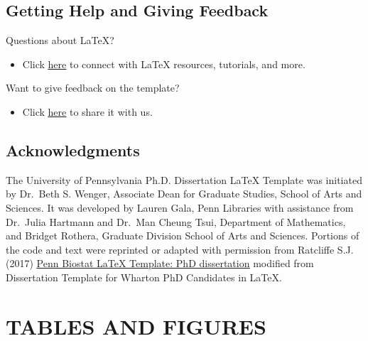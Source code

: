 \documentclass[11pt]{report}
\begin{document}
\begin{mainf}
\section{Getting Help and Giving Feedback} \label{sec:helpfeedback}
Questions about LaTeX?
\begin{itemize}
    \item Click \underline{\href{https://guides.library.upenn.edu/LaTeX}{here}} to connect with LaTeX resources, tutorials, and more.
\end{itemize}
Want to give feedback on the template?
\begin{itemize}
    \item Click \underline{\href{https://upenn.libwizard.com/f/dissertationlatextemplatefeedback}{here}} to share it with us.
\end{itemize}

\section{Acknowledgments}
The University of Pennsylvania Ph.D. Dissertation LaTeX Template was initiated by Dr.~Beth S. Wenger, Associate Dean for Graduate Studies, School of Arts and Sciences. It was developed by Lauren Gala, Penn Libraries with assistance from Dr.~Julia Hartmann and Dr.~Man Cheung Tsui, Department of Mathematics, and Bridget Rothera, Graduate Division School of Arts and Sciences. Portions of the code and text were reprinted or adapted with permission from Ratcliffe S.J. (2017) \underline{\href{https://dbe.med.upenn.edu/biostat-research/Dissertation\_template}{Penn Biostat LaTeX Template: PhD dissertation}} modified from Dissertation Template for Wharton PhD Candidates in LaTeX.

\chapter{\MakeUppercase{Tables and Figures}}

\end{mainf}
\end{document}
